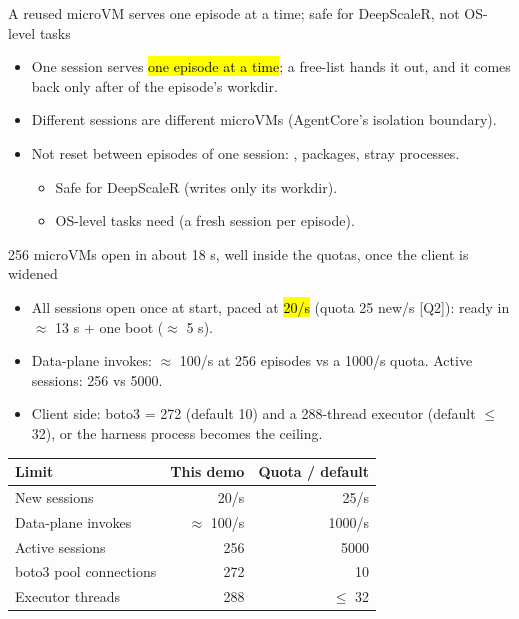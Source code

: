 \begin{frame}{A reused microVM serves one episode at a time; safe for DeepScaleR, not OS-level tasks}
\begin{itemize}\small\setlength{\itemsep}{3mm}
\item One session serves \hl{one episode at a time}; a free-list hands it out, and it comes back only after  of the episode's workdir.
\item Different sessions are different microVMs (AgentCore's isolation boundary).
\item Not reset between episodes of one session: , packages, stray processes.
\begin{itemize}
\item Safe for DeepScaleR (writes only its workdir).
\item OS-level tasks need  (a fresh session per episode).
\end{itemize}
\end{itemize}
\vspace{4mm}
\end{frame}

\begin{frame}{256 microVMs open in about 18 s, well inside the quotas, once the client is widened}
\begin{itemize}\small\setlength{\itemsep}{3mm}
\item All sessions open once at start, paced at \hl{20/s} (quota 25 new/s [Q2]): ready in $\approx$ 13 s + one boot ($\approx$ 5 s).
\item Data-plane invokes: $\approx$ 100/s at 256 episodes vs a 1000/s quota. Active sessions: 256 vs 5000.
\item Client side: boto3  = 272 (default 10) and a 288-thread executor (default $\le$ 32), or the harness process becomes the ceiling.
\end{itemize}
\vspace{3mm}
\footnotesize
\begin{tabular}{@{}lrr@{}}
\toprule
\textbf{Limit} & \textbf{This demo} & \textbf{Quota / default}\\
\midrule
New sessions & 20/s & 25/s\\
Data-plane invokes & $\approx$ 100/s & 1000/s\\
Active sessions & 256 & 5000\\
boto3 pool connections & 272 & 10\\
Executor threads & 288 & $\le$ 32\\
\bottomrule
\end{tabular}
\end{frame}

